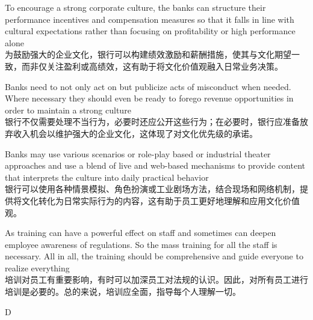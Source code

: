 \documentclass{article}
\begin{document}
\begin{choices}
    \item To encourage a strong corporate culture, the banks can structure their performance incentives and compensation measures so that it falls in line with cultural expectations rather than focusing on profitability or high performance alone\\
    为鼓励强大的企业文化，银行可以构建绩效激励和薪酬措施，使其与文化期望一致，而非仅关注盈利或高绩效，这有助于将文化价值观融入日常业务决策。
    \item Banks need to not only act on but publicize acts of misconduct when needed. Where necessary they should even be ready to forego revenue opportunities in order to maintain a strong culture\\
    银行不仅需要处理不当行为，必要时还应公开这些行为；在必要时，银行应准备放弃收入机会以维护强大的企业文化，这体现了对文化优先级的承诺。
    \item Banks may use various scenarios or role-play based or industrial theater approaches and use a blend of live and web-based mechanisms to provide content that interprets the culture into daily practical behavior\\
    银行可以使用各种情景模拟、角色扮演或工业剧场方法，结合现场和网络机制，提供将文化转化为日常实际行为的内容，这有助于员工更好地理解和应用文化价值观。
    \item As training can have a powerful effect on staff and sometimes can deepen employee awareness of regulations. So the mass training for all the staff is necessary. All in all, the training should be comprehensive and guide everyone to realize everything\\
    培训对员工有重要影响，有时可以加深员工对法规的认识。因此，对所有员工进行培训是必要的。总的来说，培训应全面，指导每个人理解一切。
\end{choices}

\begin{correctanswer}
    D
\end{correctanswer}
\end{document}
